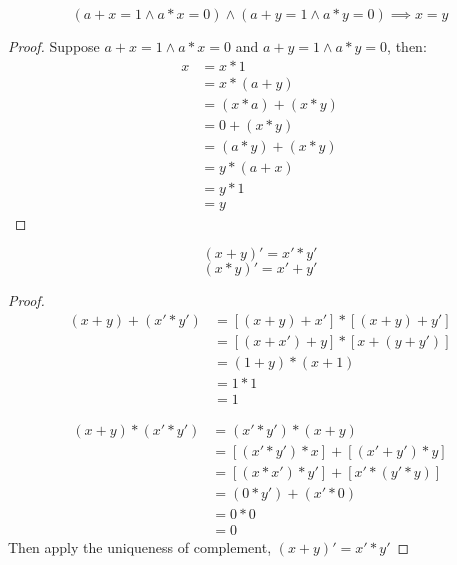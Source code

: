 \newpage
\begin{theorem}
\[ (a + x = 1 \land a * x = 0) \land (a + y = 1 \land a * y = 0) \implies x = y \]
\end{theorem}

\begin{proof}
Suppose $a + x = 1 \land a * x = 0$ and $a + y = 1 \land a * y = 0$, then:
\begin{align*}
x & = x * 1 \\
  & = x * (a + y) \\
  & = (x * a) + (x * y) \\
  & = 0 + (x * y) \\
  & = (a * y) + (x * y) \\
  & = y * (a + x) \\
  & = y * 1 \\
  & = y
\end{align*}
\end{proof}

\newpage
\begin{theorem}
\[ (x + y)' = x' * y' \]
\[ (x * y)' = x' + y' \]
\end{theorem}

\begin{proof}

\begin{align*}
    (x + y) + (x' * y')
& = [(x + y) + x'] * [(x + y) + y'] \\
& = [(x + x') + y] * [x + (y + y')] \\
& = (1 + y) * (x + 1) \\
& = 1 * 1 \\
& = 1
\end{align*}

\begin{align*}
    (x + y) * (x' * y')
& = (x' * y') * (x + y) \\
& = [(x' * y') * x] + [(x' + y') * y] \\
& = [(x * x') * y'] + [x' * (y' * y)] \\
& = (0 * y') + (x' * 0) \\
& = 0 * 0 \\
& = 0
\end{align*}
Then apply the uniqueness of complement, $(x + y)' = x' * y'$
\end{proof}


